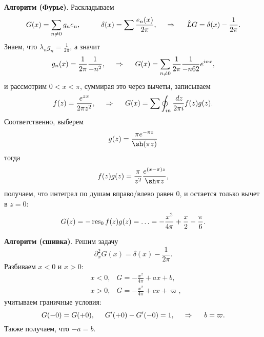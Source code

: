 \textbf{Алгоритм (Фурье)}. Раскладываем 
\begin{equation*}
    G(x) = \sum_{n \neq 0} g_n e_n,
    \hspace{10 mm} 
    \delta(x) = \sum \frac{e_n (x)}{2 \pi},
    \hspace{0.5cm} \Rightarrow \hspace{0.5cm}
    \hat{L} G = \delta(x) - \frac{1}{2\pi}.
\end{equation*}
Знаем, что $\lambda_n g_n = \frac{1}{2\pi}$, а значит
\begin{equation*}
    g_n(x) = \frac{1}{2\pi} \frac{1}{- n^2},
    \hspace{0.5cm} \Rightarrow \hspace{0.5cm}   
    G(x) = \sum_{n \neq 0} \frac{1}{2\pi} \frac{1}{-n62} e^{i n x},
\end{equation*}
и рассмотрим $0 < x < \pi$, суммирая это через вычеты, записываем
\begin{equation*}
    f(z) = \frac{e^{zx}}{2 \pi z^2}, 
    \hspace{0.5cm} \Rightarrow \hspace{0.5cm}   
    G(x) = \sum \oint_{in} \frac{\, d z}{2 \pi i} f(z) g(z).
\end{equation*}
Соответственно, выберем
\begin{align*}
    g(z) = \frac{\pi e^{- \pi z}}{\sh (\pi z)}
\end{align*}
тогда
\begin{equation*}
    f(z) g(z) = \frac{\pi}{z^2} \frac{e^{(x-\pi)z}}{\sh \pi z},
\end{equation*}
получаем, что интеграл по душам вправо/влево  равен $0$, и остается только вычет в $z = 0$:
\begin{equation*}
    G(z) = - \mathop{\mathrm{res}}\nolimits_0 f(z) g(z) = \ldots = - \frac{x^2}{4 \pi} + \frac{x}{2} - \frac{\pi}{6}.
\end{equation*}



\textbf{Алгоритм (сшивка)}. Решим задачу
\begin{equation*}
    \partial_x^2 G(x) = \delta(x) - \frac{1}{2\pi}.
\end{equation*}
Разбиваем $x < 0$ и $x > 0$:
\begin{align*}
    &x < 0, 
    & G = -\tfrac{x^2}{4 \pi} + a x + b, \\
    &x > 0, 
    & G = -\tfrac{x^2}{4 \pi} + c x + \varpi, 
\end{align*}
учитываем граничные условия:
\begin{equation*}
    G(-0) = G(+0),
    \hspace{5 mm} 
    G'(+0) - G'(-0) = 1,
    \hspace{0.5cm} \Rightarrow \hspace{0.5cm}   
    b = \varpi.
\end{equation*}
Также получаем, что $-a = b$.

